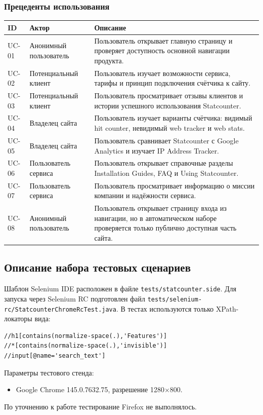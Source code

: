 \documentclass[12pt,a4paper]{report}
\begin{document}
\subsubsection*{Прецеденты использования}
\begin{longtable}{|p{2.0cm}|p{3.2cm}|p{9.8cm}|}
\hline
\textbf{ID} & \textbf{Актор} & \textbf{Описание} \\
\hline
UC-01 & Анонимный пользователь & Пользователь открывает главную страницу и проверяет доступность основной навигации продукта. \\
\hline
UC-02 & Потенциальный клиент & Пользователь изучает возможности сервиса, тарифы и принцип подключения счётчика к сайту. \\
\hline
UC-03 & Потенциальный клиент & Пользователь просматривает отзывы клиентов и истории успешного использования Statcounter. \\
\hline
UC-04 & Владелец сайта & Пользователь изучает варианты счётчика: видимый hit counter, невидимый web tracker и web stats. \\
\hline
UC-05 & Владелец сайта & Пользователь сравнивает Statcounter с Google Analytics и изучает IP Address Tracker. \\
\hline
UC-06 & Пользователь сервиса & Пользователь открывает справочные разделы Installation Guides, FAQ и Using Statcounter. \\
\hline
UC-07 & Пользователь сервиса & Пользователь просматривает информацию о миссии компании и надёжности сервиса. \\
\hline
UC-08 & Анонимный пользователь & Пользователь открывает страницу входа из навигации, но в автоматическом наборе проверяется только публично доступная часть сайта. \\
\hline
\end{longtable}

\subsection*{Описание набора тестовых сценариев}
Шаблон Selenium IDE расположен в файле \texttt{tests/statcounter.side}. Для запуска через
Selenium RC подготовлен файл \texttt{tests/selenium-rc/StatcounterChromeRcTest.java}. В тестах
используются только XPath-локаторы вида:
\begin{verbatim}
//h1[contains(normalize-space(.),'Features')]
//*[contains(normalize-space(.),'invisible')]
//input[@name='search_text']
\end{verbatim}
Параметры тестового стенда:
\begin{itemize}
    \item Google Chrome 145.0.7632.75, разрешение 1280$\times$800.
\end{itemize}
По уточнению к работе тестирование Firefox не выполнялось.
\end{document}
